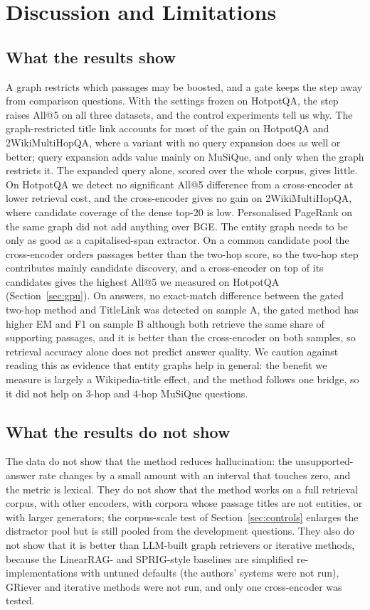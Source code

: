\documentclass[a4paper,fleqn]{cas-sc}
\begin{document}
\section{Discussion and Limitations}\label{sec:discussion}
\subsection{What the results show}
A graph restricts which passages may be boosted, and a gate keeps the step away from comparison questions. With the settings frozen on HotpotQA, the step raises All@5 on all three datasets, and the control experiments tell us why. The graph-restricted title link accounts for most of the gain on HotpotQA and 2WikiMultiHopQA, where a variant with no query expansion does as well or better; query expansion adds value mainly on MuSiQue, and only when the graph restricts it. The expanded query alone, scored over the whole corpus, gives little. On HotpotQA we detect no significant All@5 difference from a cross-encoder at lower retrieval cost, and the cross-encoder gives no gain on 2WikiMultiHopQA, where candidate coverage of the dense top-20 is low. Personalised PageRank on the same graph did not add anything over BGE. The entity graph needs to be only as good as a capitalised-span extractor. On a common candidate pool the cross-encoder orders passages better than the two-hop score, so the two-hop step contributes mainly candidate discovery, and a cross-encoder on top of its candidates gives the highest All@5 we measured on HotpotQA (Section~\ref{sec:gpu}). On answers, no exact-match difference between the gated two-hop method and TitleLink was detected on sample A, the gated method has higher EM and F1 on sample B although both retrieve the same share of supporting passages, and it is better than the cross-encoder on both samples, so retrieval accuracy alone does not predict answer quality. We caution against reading this as evidence that entity graphs help in general: the benefit we measure is largely a Wikipedia-title effect, and the method follows one bridge, so it did not help on 3-hop and 4-hop MuSiQue questions.

\subsection{What the results do not show}
The data do not show that the method reduces hallucination: the unsupported-answer rate changes by a small amount with an interval that touches zero, and the metric is lexical. They do not show that the method works on a full retrieval corpus, with other encoders, with corpora whose passage titles are not entities, or with larger generators; the corpus-scale test of Section~\ref{sec:controls} enlarges the distractor pool but is still pooled from the development questions. They also do not show that it is better than LLM-built graph retrievers or iterative methods, because the LinearRAG- and SPRIG-style baselines are simplified re-implementations with untuned defaults (the authors' systems were not run), GRiever and iterative methods were not run, and only one cross-encoder was tested.
\end{document}
